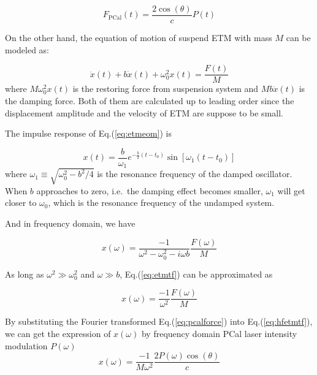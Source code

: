 \begin{equation}
\label{eq:pcalforce}
    F_\text{PCal}(t) = \frac{ 2 \cos(\theta) }{c} P(t) 
\end{equation}


On the other hand, the equation of motion of suspend ETM with mass $M$ can be modeled as:

\begin{equation}
\label{eq:etmeom}
    \ddot{x}(t) + b \dot{x}(t) + \omega_0^2 x(t) = \frac{F(t)}{M} 
\end{equation}
where $M \omega_0^2 x(t)$ is the restoring force from suspension system and $M b\dot{x}(t)$ is the damping force. Both of them are calculated up to leading order since the displacement amplitude and the velocity of ETM are suppose to be small. 


%


The impulse response of Eq.(\ref{eq:etmeom}) is

\begin{equation}
    x(t)=\frac{b}{\omega_1}e^{-\frac{b}{2}(t-t_0)}\sin[\omega_1 (t-t_0)]
\end{equation}
where $\omega_1 \equiv \sqrt{\omega_0^2 - b^2/4}$ is the resonance frequency of the damped oscillator. When $b$ approaches to zero, i.e.~the damping effect becomes smaller, $\omega_1$ will get closer to $\omega_0$, which is the resonance frequency of the undamped system.


And in frequency domain, we have

\begin{equation}
\label{eq:etmtf}
   x(\omega)=\frac{-1}{\omega^2 - \omega_0^2 - i \omega b} \frac{F(\omega)}{M}
\end{equation}

As long as $\omega^2 \gg \omega_0^2$ and $\omega \gg b$, Eq.(\ref{eq:etmtf}) can be approximated as

\begin{equation}
\label{eq:hfetmtf}
   x(\omega)=\frac{-1}{\omega^2}\frac{F(\omega)}{M}
\end{equation}

By substituting the Fourier transformed Eq.({\ref{eq:pcalforce}}) into Eq.({\ref{eq:hfetmtf}}), we can get the expression of $x(\omega)$ by frequency domain PCal laser intensity modulation $P(\omega)$
\begin{equation}
\label{eq:pcaldisp}
    x(\omega) = \frac{-1}{M \omega^2} \frac{2  P(\omega) \cos(\theta)}{c} 
\end{equation}



